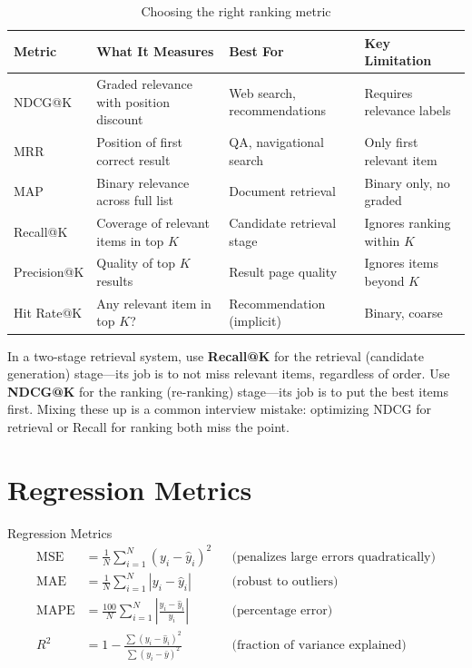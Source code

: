 \begin{table}[H]
\centering
\caption{Choosing the right ranking metric}
\begin{tabularx}{\textwidth}{lXXX}
\toprule
\textbf{Metric} & \textbf{What It Measures} & \textbf{Best For} & \textbf{Key Limitation} \\
\midrule
NDCG@K & Graded relevance with position discount & Web search, recommendations & Requires relevance labels \\
MRR & Position of first correct result & QA, navigational search & Only first relevant item \\
MAP & Binary relevance across full list & Document retrieval & Binary only, no graded \\
Recall@K & Coverage of relevant items in top $K$ & Candidate retrieval stage & Ignores ranking within $K$ \\
Precision@K & Quality of top $K$ results & Result page quality & Ignores items beyond $K$ \\
Hit Rate@K & Any relevant item in top $K$? & Recommendation (implicit) & Binary, coarse \\
\bottomrule
\end{tabularx}
\end{table}

\begin{keyinsight}
In a two-stage retrieval system, use \textbf{Recall@K} for the retrieval (candidate generation) stage---its job is to not miss relevant items, regardless of order. Use \textbf{NDCG@K} for the ranking (re-ranking) stage---its job is to put the best items first. Mixing these up is a common interview mistake: optimizing NDCG for retrieval or Recall for ranking both miss the point.
\end{keyinsight}

\section{Regression Metrics}
\label{sec:regression_metrics}

\begin{mathresult}{Regression Metrics}
\begin{align}
\text{MSE} &= \frac{1}{N}\sum_{i=1}^{N}(y_i - \hat{y}_i)^2 & &\text{(penalizes large errors quadratically)} \\[4pt]
\text{MAE} &= \frac{1}{N}\sum_{i=1}^{N}|y_i - \hat{y}_i| & &\text{(robust to outliers)} \\[4pt]
\text{MAPE} &= \frac{100}{N}\sum_{i=1}^{N}\left|\frac{y_i - \hat{y}_i}{y_i}\right| & &\text{(percentage error)} \\[4pt]
R^2 &= 1 - \frac{\sum(y_i - \hat{y}_i)^2}{\sum(y_i - \bar{y})^2} & &\text{(fraction of variance explained)}
\end{align}
\end{mathresult}

